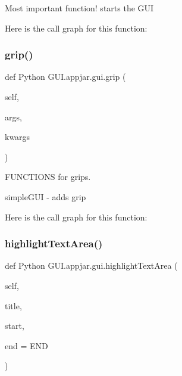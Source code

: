 \begin{DoxyVerb}Most important function! starts the GUI \end{DoxyVerb}
 Here is the call graph for this function\+:
\mbox{\label{class_python_01_g_u_i_1_1appjar_1_1gui_a911fe03dc7db69b2b073909996569841}} 
\subsubsection{\texorpdfstring{grip()}{grip()}}
{\footnotesize\ttfamily def Python G\+U\+I.\+appjar.\+gui.\+grip (\begin{DoxyParamCaption}\item[{}]{self,  }\item[{}]{args,  }\item[{}]{kwargs }\end{DoxyParamCaption})}



F\+U\+N\+C\+T\+I\+O\+NS for grips. 

\begin{DoxyVerb}simpleGUI - adds grip \end{DoxyVerb}
 Here is the call graph for this function\+:
\mbox{\label{class_python_01_g_u_i_1_1appjar_1_1gui_a73b1590d6dbc5bce7912a9cd4ede4027}} 
\subsubsection{\texorpdfstring{highlight\+Text\+Area()}{highlightTextArea()}}
{\footnotesize\ttfamily def Python G\+U\+I.\+appjar.\+gui.\+highlight\+Text\+Area (\begin{DoxyParamCaption}\item[{}]{self,  }\item[{}]{title,  }\item[{}]{start,  }\item[{}]{end = {\ttfamily END} }\end{DoxyParamCaption})}

